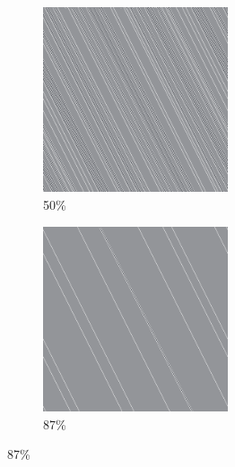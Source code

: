 \documentclass[12pt, fleqn]{report}                             %
\theoremstyle{break}                                            %
\begin{document}
\begin{figure}[ht!]
\begin{subfigure}[b]{0.4\linewidth}
          \includegraphics[width=0.6\textwidth]{Images/27/c.png}
          \caption{50\%}
        \end{subfigure}
        \begin{subfigure}[b]{0.4\linewidth}
          \includegraphics[width=0.6\textwidth]{Images/27/d.png}
          \caption{87\%}
        \end{subfigure}
      \end{figure}
\end{document}
